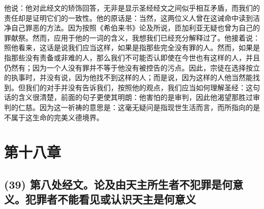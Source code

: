 他说：他对此经文的矫饰回答，无非是显示圣经经文之间似乎相互矛盾，而我们的责任却是证明它们的一致性。他的原话是：当然，这两位义人曾在这诫命中读到洁净自己罪恶的方法。因为按照《希伯来书》论及所说，匝加利亚无疑也曾为自己的罪献祭。然而，应用于他的一词的含义，我想我们已经充分解释过了。他接着说：照他看来，这话是说我们应当这样，如果是指那些完全没有罪的人。然而，如果是指那些没有责备或非难的人，那么我们不可能否认即使在今世也有这样的人，并且仍然有；因为一个人没有罪并不等于他没有被控告的污点。因此，宗徒在选择按立的执事时，并没有说，因为他找不到这样的人；而是说，因为这样的人他当然能找到。但我们的对手并没有告诉我们，按照他的观点，我们应当如何理解圣经：这句话的含义很清楚，前面的句子更使其明朗：他害怕的是审判，因此他渴望那胜过审判的仁慈。因为这一祈祷的意思是：这毫无疑问是指现世生活而言，而所指向的是不属于这生命的完美义德境界。\par


\section{第十八章}


\subsection{(39) 第八处经文。论及由天主所生者不犯罪是何意义。犯罪者不能看见或认识天主是何意义}

